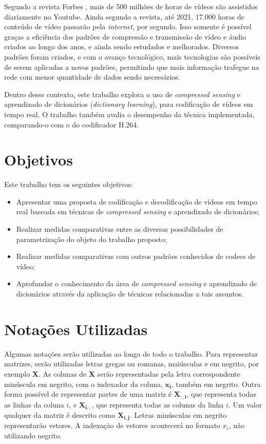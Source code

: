 \documentclass[cic,tc]{iiufrgs}
\renewcommand{\vec}[1]{\bm{#1}}
\newcommand{\mat}[1]{\bm{#1}}
\begin{document}
Segundo a revista Forbes \cite{VideoMarketing}, mais de 500 milhões de horas de vídeos são assistidos 
diariamente no Youtube. 
Ainda segundo a revista, até 2021, 17.000 horas de conteúdo de vídeo passarão 
pela \emph{internet}, por segundo.
Isso somente é possível graças a eficiência 
dos padrões de compressão e transmissão de vídeo e áudio criados ao longo dos anos, 
e ainda sendo estudados e melhorados.
Diversos padrões foram criados, e com o avanço tecnológico, mais tecnologias
são possíveis de serem aplicadas a novos padrões, permitindo que mais informação
trafegue na rede com menor quantidade de dados sendo necessários.

Dentro desse contexto, este trabalho explora o uso de \emph{compressed sensing} e aprendizado de 
dicionários (\emph{dictionary learning}), para 
codificação de vídeos em tempo real.
O trabalho também avalia o desempenho da técnica implementada, comparando-o com o do codificador H.264. 

\section{Objetivos}
Este trabalho tem os seguintes objetivos:
\begin{itemize}
    \item Apresentar uma proposta de codificação e decodificação de vídeos
    em tempo real baseada em técnicas de \emph{compressed sensing} e aprendizado de 
    dicionários;
    \item Realizar medidas comparativas entre as diversas possibilidades 
    de parametrização do objeto do trabalho proposto;
    \item Realizar medidas comparativas com outros padrões conhecidos de 
    codecs de vídeo;
    \item Aprofundar o conhecimento da área de \emph{compressed sensing} e aprendizado 
    de dicionários através da aplicação de técnicas relacionadas a tais assuntos.
\end{itemize}

\section{Notações Utilizadas}
Algumas notações serão utilizadas ao longo de todo o trabalho.
Para representar matrizes, serão utilizadas letras gregas ou romanas, 
maiúsculas e em negrito, por exemplo $\mat{X}$.
As colunas de $\mat{X}$ serão representadas pela letra correspondente 
minúscula em negrito, com o indexador da coluna, $\vec{x_i}$, também em negrito.
Outra forma possível de representar partes de uma matriz é $\mat{X_{:,i}}$,
que representa todas as linhas da coluna $i$, e $\mat{X_{i,:}}$, que representa 
todas as colunas da linha $i$.
Um valor qualquer da matriz é descrito como $\mat{X_{i,j}}$.
Letras minúsculas em negrito representarão vetores.
A indexação de vetores acontecerá no formato $x_i$, não utilizando negrito. %
\end{document}

